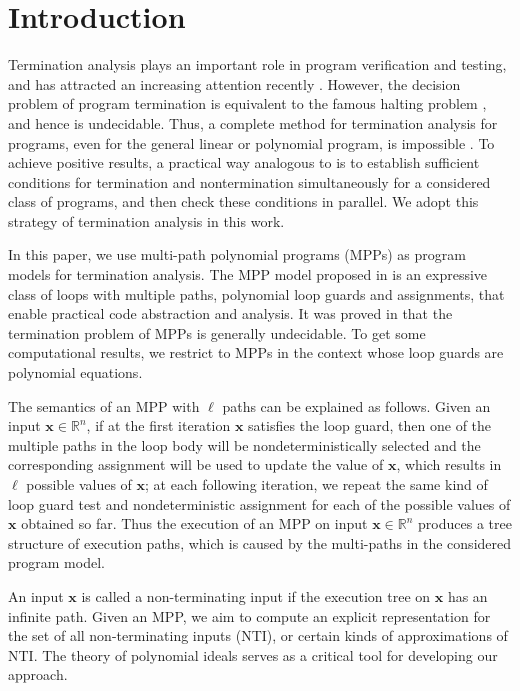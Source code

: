\documentclass{jssc}
\newcommand{\xx}{\mathbf{x}}
\begin{document}

\section{Introduction}
Termination analysis plays an important role in program verification and testing, and has attracted an increasing attention recently \cite{cook:termination,yang:advances}. However, the decision problem of program termination is equivalent to the famous halting problem \cite{turing:computable}, and hence is undecidable. Thus, a complete method for termination analysis for programs, even for the general linear or polynomial program, is impossible \cite{tiwari:terminate,bradley:polynomial,braverman:terminate}. To achieve positive results, a practical way analogous to \cite{Harris10} is to establish sufficient conditions for termination and nontermination simultaneously for a considered class of programs, and then check these conditions in parallel. We adopt this strategy of termination analysis in this work.

In this paper, we use multi-path polynomial programs (MPPs) as program models for termination analysis. The MPP model proposed in \cite{bradley:polynomial} is an expressive class of loops with multiple paths, polynomial loop guards and assignments, that enable practical code abstraction and analysis. It was proved in \cite{bradley:polynomial} that the termination problem of MPPs is generally undecidable. To get some computational results, we restrict to MPPs in the context whose loop guards are polynomial equations.

The semantics of an MPP with $\ell$ paths can be explained as follows. Given an input $\xx \in \mathbb{R}^n$, if at the first iteration $\xx$ satisfies the loop guard, then one of the multiple paths in the loop body will be nondeterministically selected and the corresponding assignment will be used to update the value of $\xx$, which results in $\ell$ possible values of $\xx$; at each following iteration, we repeat the same kind of loop guard test and nondeterministic assignment for each of the possible values of $\xx$ obtained so far. Thus the execution of an MPP on input $\xx \in \mathbb{R}^n$ produces a tree structure of execution paths, which is caused by the multi-paths in the considered program model.

An input $\xx$ is called a non-terminating input if the execution tree on $\xx$ has an infinite path. Given an MPP, we aim to compute an explicit representation for the set of all non-terminating inputs (NTI), or certain kinds of approximations of NTI. The theory of polynomial ideals serves as a critical tool for developing our approach.
\end{document}
